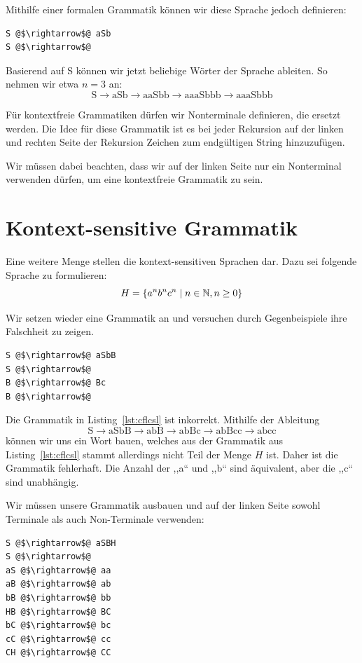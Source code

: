 Mithilfe einer formalen Grammatik können wir diese Sprache jedoch definieren:
\begin{lstlisting}
S @$\rightarrow$@ aSb
S @$\rightarrow$@
\end{lstlisting}

Basierend auf S können wir jetzt beliebige Wörter der Sprache ableiten. So nehmen wir etwa $n=3$ an:
\[
  \text{S} \rightarrow \text{aSb} \rightarrow \text{aaSbb} \rightarrow
  \text{aaaSbbb} \rightarrow \text{aaaSbbb} 
\]

Für kontextfreie Grammatiken dürfen wir Nonterminale definieren, die ersetzt werden. Die Idee für diese Grammatik ist es bei jeder Rekursion auf der linken und rechten Seite der Rekursion Zeichen zum endgültigen String hinzuzufügen.

Wir müssen dabei beachten, dass wir auf der linken Seite nur ein Nonterminal verwenden dürfen, um eine kontextfreie Grammatik zu sein.

\section{Kontext-sensitive Grammatik}
%
Eine weitere Menge stellen die kontext-sensitiven Sprachen dar. Dazu sei folgende Sprache zu formulieren:
\[
  H = \left\{a^n b^n c^n \mid n \in \mathbb{N}, n \geq 0\right\}
\]

Wir setzen wieder eine Grammatik an und versuchen durch Gegenbeispiele ihre Falschheit zu zeigen.
\begin{lstlisting}
S @$\rightarrow$@ aSbB
S @$\rightarrow$@
B @$\rightarrow$@ Bc
B @$\rightarrow$@
\end{lstlisting}

Die Grammatik in Listing~\ref{lst:cflcsl} ist inkorrekt. Mithilfe der Ableitung
\[
  \text{S} \rightarrow \text{aSbB} \rightarrow \text{abB} \rightarrow 
  \text{abBc} \rightarrow \text{abBcc} \rightarrow \text{abcc}
\]
können wir uns ein Wort bauen, welches aus der Grammatik aus Listing~\ref{lst:cflcsl} stammt allerdings nicht Teil der Menge $H$ ist. Daher ist die Grammatik fehlerhaft. Die Anzahl der ,,a`` und ,,b`` sind äquivalent, aber die ,,c`` sind unabhängig.

Wir müssen unsere Grammatik ausbauen und auf der linken Seite sowohl Terminale als auch Non-Terminale verwenden:
\begin{lstlisting}
S @$\rightarrow$@ aSBH
S @$\rightarrow$@
aS @$\rightarrow$@ aa
aB @$\rightarrow$@ ab
bB @$\rightarrow$@ bb
HB @$\rightarrow$@ BC
bC @$\rightarrow$@ bc
cC @$\rightarrow$@ cc
CH @$\rightarrow$@ CC
\end{lstlisting}

